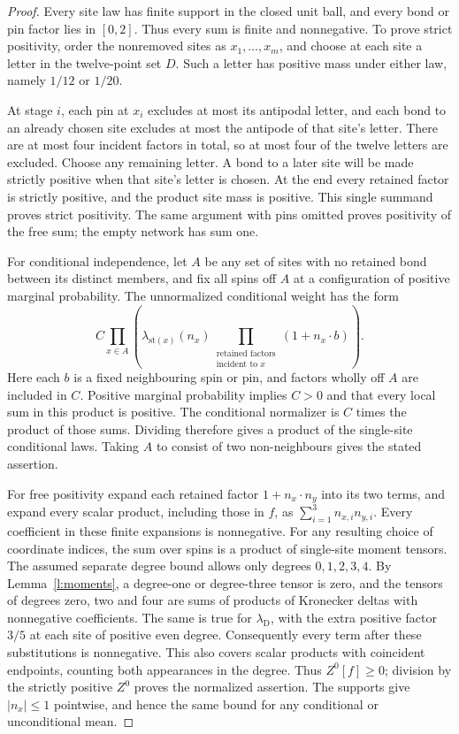 \begin{proof}
Every site law has finite support in the closed unit ball, and every
bond or pin factor lies in \([0,2]\). Thus every sum is finite and
nonnegative. To prove strict positivity, order the nonremoved sites
as \(x_1,\ldots,x_m\), and choose at each site a letter in the
twelve-point set \(D\). Such a letter has positive mass under either
law, namely \(1/12\) or \(1/20\).

At stage \(i\), each pin at \(x_i\) excludes at most its antipodal
letter, and each bond to an already chosen site excludes at most the
antipode of that site's letter. There are at most four incident
factors in total, so at most four of the twelve letters are excluded.
Choose any remaining letter. A bond to a later site will be made
strictly positive when that site's letter is chosen. At the end every
retained factor is strictly positive, and the product site mass is
positive. This single summand proves strict positivity. The same
argument with pins omitted proves positivity of the free sum; the
empty network has sum one.

For conditional independence, let \(A\) be any set of sites with no
retained bond between its distinct members, and fix all spins off
\(A\) at a configuration of positive marginal probability. The
unnormalized conditional weight has the form
\[
 C\prod_{x\in A}
 \left(\lambda_{\mathrm{st}(x)}(n_x)
       \prod_{\substack{\text{retained factors}\\\text{incident to }x}}
                     (1+n_x\cdot b)\right).
\]
Here each \(b\) is a fixed neighbouring spin or pin, and factors
wholly off \(A\) are included in \(C\). Positive marginal probability
implies \(C>0\) and that every local sum in this product is positive.
The conditional normalizer is \(C\) times the product of those sums.
Dividing therefore gives a product of the single-site conditional
laws. Taking \(A\) to consist of two non-neighbours gives the stated
assertion.

For free positivity expand each retained factor \(1+n_x\cdot n_y\)
into its two terms, and expand every scalar product, including those
in \(f\), as \(\sum_{i=1}^3n_{x,i}n_{y,i}\). Every coefficient in
these finite expansions is nonnegative. For any resulting choice
of coordinate indices, the sum over spins is a product of
single-site moment tensors. The assumed separate degree bound
allows only degrees \(0,1,2,3,4\).
By Lemma~\ref{l:moments}, a degree-one or degree-three tensor is zero,
and the tensors of degrees zero, two and four are sums of products
of Kronecker deltas with nonnegative coefficients.
The same is true for \(\lambda_{\mathrm D}\), with the extra
positive factor \(3/5\) at each site of positive even degree.
Consequently every term after these substitutions is nonnegative.
This also covers scalar products with coincident endpoints, counting
both appearances in the degree. Thus \(Z^0[f]\ge0\); division by the
strictly positive \(Z^0\) proves the normalized assertion.
The supports give \(|n_x|\le1\) pointwise, and hence the same bound
for any conditional or unconditional mean.
\end{proof}

